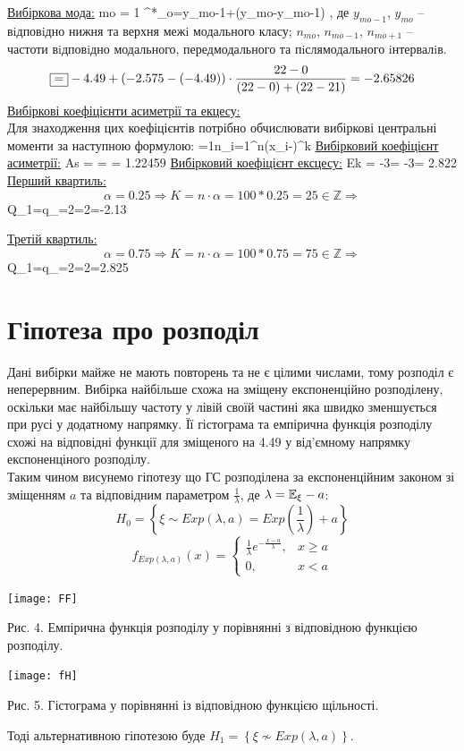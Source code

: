 \documentclass[14pt,a4paper]{scrartcl}
\begin{document}
\underline{Вибіркова мода:}
\be
  mo = 1 
\ee
\be
  ^*_o=y_{mo-1}+(y_{mo}-y_{mo-1})\cdot
  \fbox{=}
\ee
, де $y_{mo-1}$, $y_{mo}$ – вiдповiдно нижня та верхня межi модального класу; $n_{mo}$, $n_{mo-1}$, $n_{mo+1}$ –
частоти вiдповiдно модального, передмодального та пiслямодального iнтервалiв.\newpage
$$
  \fbox{=}-4.49+(-2.575-(-4.49))\cdot
  \frac{22-0}{(22-0)+(22-21)} = -2.65826
$$
\underline{Вибіркові коефіцієнти асиметрії та екцесу:}\\
Для знаходження цих коефіцієнтів потрібно обчислювати вибіркові центральні моменти за наступною формулою:
\be
  =\frac1n\sum\limits_{i=1}^n(x_i-)^k
\ee
\underline{Вибірковий коефіцієнт асиметрії:}
\be
  As = =
  =
  1.22459
\ee
\underline{Вибірковий коефіцієнт ексцесу:}
\be
  Ek = -3=
  -3=
  2.822
\ee
\underline{Перший квартиль:}
$$\alpha=0.25\Rightarrow
K = n\cdot\alpha=100*0.25=25\in\mathbb{Z}\Rightarrow$$
\be\Rightarrow Q_1=q_\alpha=2=2=-2.13\ee

\underline{Третій квартиль:}
$$\alpha=0.75\Rightarrow
K = n\cdot\alpha=100*0.75=75\in\mathbb{Z}\Rightarrow$$
\be\Rightarrow Q_1=q_\alpha=2=2=2.825\ee

\newpage
\section{Гіпотеза про розподіл}
Дані вибірки майже не мають повторень та не є цілими числами, тому розподіл є неперервним. Вибірка найбільше схожа на зміщену експоненційно розподілену, оскільки має найбільшу частоту у лівій своїй частині яка швидко зменшується при русі у додатному напрямку. Її гістограма та емпірична функція розподілу схожі на відповідні функції для зміщеного на 4.49 у від'ємному напрямку експоненціного розподілу.\\
Таким чином висунемо гіпотезу що ГС розподілена за експоненційним законом зі зміщенням $a$ та відповідним параметром $\frac1\lambda$, де $\lambda=\mathbb{E} _\xi-a$:
$$H_0=\left\{\xi\sim Exp(\lambda,a)=Exp(\frac1\lambda)+a\right\}$$
$$f_{Exp(\lambda,a)}(x)=\left\{\begin{array}{ll}
  \frac1\lambda e^{-\frac{x-a}\lambda},&x\geq a\\
  0,&x<a
\end{array}\right.$$
\begin{center}
  \texttt{[image: FF]}
  \caption{Рис. 4. Емпірична функція розподілу у порівнянні з відповідною функцією розподілу.}
\end{center}
\begin{center}
  \texttt{[image: fH]}
  \caption{Рис. 5. Гістограма у порівнянні із відповідною функцією щільності.}
\end{center}
Тоді альтернативною гіпотезою буде $H_1=\left\{\xi\nsim Exp(\lambda,a)\right\}$.
\end{document}
